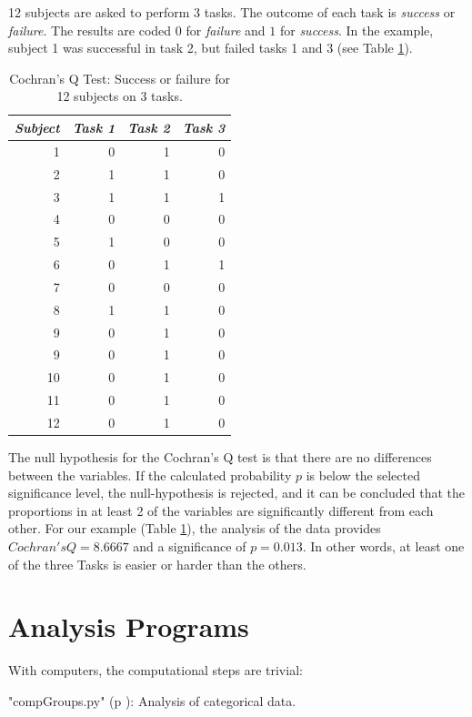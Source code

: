 12 subjects are asked to perform 3 tasks. The outcome of each task is \emph{success} or \emph{failure}. The results are coded $0$ for \emph{failure} and $1$ for \emph{success}. In the example, subject 1 was successful in task 2, but failed tasks 1 and 3 (see Table \ref{table:CochransQ}).

\begin{table}
  \centering
  \begin{tabular}{|r|r r r|}
  \hline
  \emph{Subject}& \emph{Task 1} & \emph{Task 2} & \emph{Task 3} \\
  \hline
  1  & 0 & 1 & 0 \\
  2  & 1 & 1 & 0 \\
  3  & 1 & 1 & 1 \\
  4  & 0 & 0 & 0 \\
  5  & 1 & 0 & 0 \\
  6  & 0 & 1 & 1 \\
  7  & 0 & 0 & 0 \\
  8  & 1 & 1 & 0 \\
  9  & 0 & 1 & 0 \\
  9  & 0 & 1 & 0 \\
  10 & 0 & 1 & 0 \\
  11 & 0 & 1 & 0 \\
  12 & 0 & 1 & 0 \\
  \hline
  \end{tabular}

  \caption{Cochran's Q Test: Success or failure for 12 subjects on 3 tasks.}\label{table:CochransQ}
\end{table}

The null hypothesis for the Cochran's Q test is that there are no differences between the variables. If the calculated probability $p$ is below the selected significance level, the null-hypothesis is rejected, and it can be concluded that the proportions in at least 2 of the variables are significantly different from each other. For our example (Table \ref{table:CochransQ}), the analysis of the data provides $Cochran's Q = 8.6667$ and a significance of $p = 0.013$. In other words, at least one of the three Tasks is easier or harder than the others.

\section{Analysis Programs}

With computers, the computational steps are trivial:

\PyImg "compGroups.py" (p \pageref{py:compGroups}): Analysis of categorical data.

